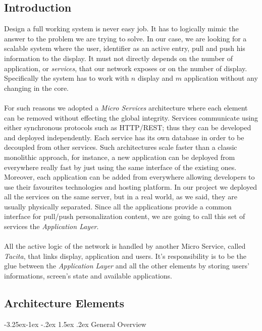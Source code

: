 \documentclass[]{usiinfbachelorproject}
\makeatletter
\newcommand\subsubsection{\@startsection{subsubsection}{3}{\z@}%
                {-3.25ex\@plus -1ex \@minus -.2ex}%
                {1.5ex \@plus .2ex}%
                {\normalfont\normalsize\bfseries}}
\makeatother
\begin{document}
\subsection{Introduction}
Design a full working system is never easy job. It has to logically mimic the answer to the problem we are trying to solve. In our case, we are looking for a scalable system where the user, identifier as an active entry, pull and push his information to the display. It must not directly depends on the number of application, or \emph{services}, that our network exposes or on the number of display. Specifically the system has to work with $n$ display and $m$ application without any changing in the core. 
\\
\\
For such reasons we adopted a \emph{Micro Services} architecture where each element can be removed without effecting the global integrity. Services communicate using either synchronous protocols such as HTTP/REST; thus they can be developed and deployed independently. Each service has its own database in order to be decoupled from other services. Such architectures scale faster than a classic monolithic approach, for instance, a new application can be deployed from everywhere really fast by just using the same interface of the existing ones. Moreover, each application can be added from everywhere allowing developers to use their favourites technologies and hosting platform.
In our project we deployed all the services on the same server, but in a real world, as we said,  they are usually physically separated. Since all the applications provide a common interface for pull/push personalization content, we are going to call this set of services the \emph{Application Layer}.\\
\\
All the active logic of the network is handled by another Micro Service, called \emph{Tacita}, that links display, application and users. It's responsibility is to be the glue between the \emph{Application Layer} and all the other elements by storing users' informations, screen's state and available applications.

\subsection{Architecture Elements}
\subsubsection{General Overview}
\end{document}
